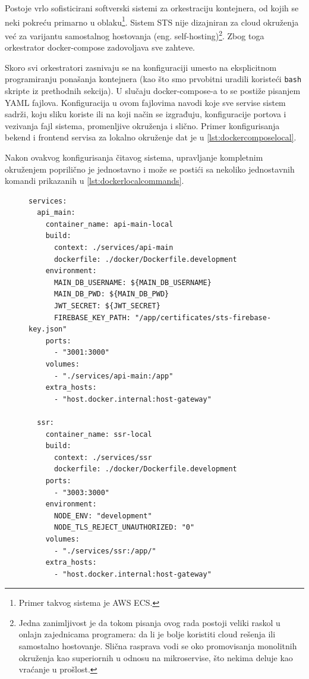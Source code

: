 \documentclass[12pt,oneside]{memoir}
\begin{document}
Postoje vrlo sofisticirani softverski sistemi za orkestraciju kontejnera, od kojih se neki pokreću primarno u oblaku\footnote{Primer takvog sistema je AWS ECS.}. Sistem STS nije dizajniran za cloud okruženja već za varijantu samostalnog hostovanja (eng. self-hosting)\footnote{Jedna zanimljivost je da tokom pisanja ovog rada postoji veliki raskol u onlajn zajednicama programera: da li je bolje koristiti cloud rešenja ili samostalno hostovanje. Slična rasprava vodi se oko promovisanja monolitnih okruženja kao superiornih u odnosu na mikroservise, što nekima deluje kao vraćanje u prošlost.}. Zbog toga orkestrator docker-compose zadovoljava sve zahteve.

Skoro svi orkestratori zasnivaju se na konfiguraciji umesto na eksplicitnom programiranju ponašanja kontejnera (kao što smo prvobitni uradili koristeći \verb|bash| skripte iz prethodnih sekcija). U slučaju docker-compose-a to se postiže pisanjem YAML fajlova. Konfiguracija u ovom fajlovima navodi koje sve servise sistem sadrži, koju sliku koriste ili na koji način se izgrađuju, konfiguracije portova i vezivanja fajl sistema, promenljive okruženja i slično. Primer konfigurisanja bekend i frontend servisa za lokalno okruženje dat je u \ref{lst:dockercomposelocal}.

Nakon ovakvog konfigurisanja čitavog sistema, upravljanje kompletnim okruženjem poprilično je jednostavno i može se postići sa nekoliko jednostavnih komandi prikazanih u \ref{lst:dockerlocalcommands}.

\begin{figure}[h]
\begin{lstlisting}[language=docker-compose, caption={docker-compose konfiguracija nekih razvojnih servisa.}, label={lst:dockercomposelocal}]
services:
  api_main:
    container_name: api-main-local
    build:
      context: ./services/api-main
      dockerfile: ./docker/Dockerfile.development
    environment:
      MAIN_DB_USERNAME: ${MAIN_DB_USERNAME}
      MAIN_DB_PWD: ${MAIN_DB_PWD}
      JWT_SECRET: ${JWT_SECRET}
      FIREBASE_KEY_PATH: "/app/certificates/sts-firebase-key.json"
    ports:
      - "3001:3000"
    volumes:
      - "./services/api-main:/app"
    extra_hosts:
      - "host.docker.internal:host-gateway"

  ssr:
    container_name: ssr-local
    build:
      context: ./services/ssr
      dockerfile: ./docker/Dockerfile.development
    ports:
      - "3003:3000"
    environment:
      NODE_ENV: "development"
      NODE_TLS_REJECT_UNAUTHORIZED: "0"
    volumes:
      - "./services/ssr:/app/"
    extra_hosts:
      - "host.docker.internal:host-gateway"
\end{lstlisting}
\end{figure}
\end{document}
